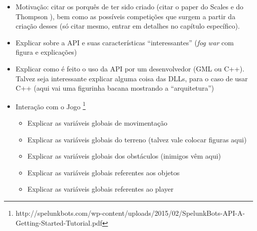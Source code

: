 \begin{itemize}
    \item Motivação: citar os porquês de ter sido criado (citar o paper do
        Scales e do Thompson \cite{SPELUNKBOTSPAPER}), bem como as possíveis
        competições que surgem a partir da criação desses (só citar mesmo,
        entrar em detalhes no capítulo específico).
    \item Explicar sobre a API e suas características ``interessantes''
        (\textit{fog war} com figura e explicações)
    \item Explicar como é feito o uso da API por um desenvolvedor (GML ou
        C++). Talvez seja interessante explicar alguma coisa das DLLs,
        para o caso de usar C++ (aqui vai uma figurinha bacana mostrando a
        ``arquitetura'')
    \item Interação com o Jogo
        \footnote{http://spelunkbots.com/wp-content/uploads/2015/02/SpelunkBots-API-A-Getting-Started-Tutorial.pdf}
    \begin{itemize}
        \item Explicar as variáveis globais de movimentação
        \item Explicar as variáveis globais do terreno (talvez vale
            colocar figuras aqui)
        \item Explicar as variáveis globais dos obstáculos (inimigos vêm aqui)
        \item Explicar as variáveis globais referentes aos objetos
        \item Explicar as variáveis globais referentes ao player
    \end{itemize}
\end{itemize}
